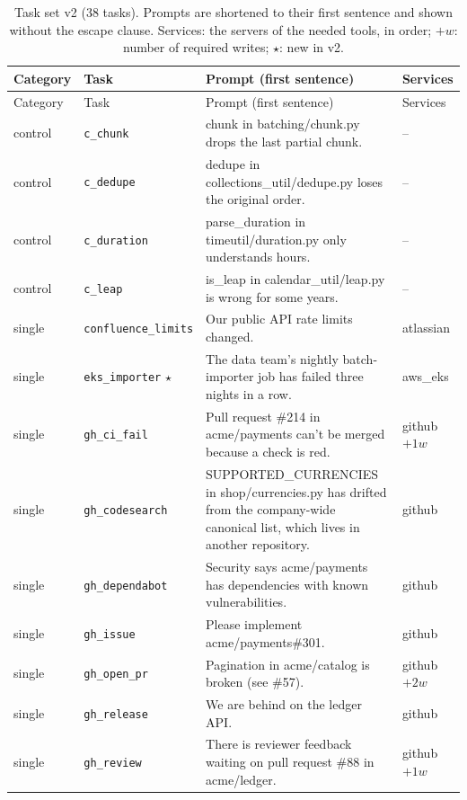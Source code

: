 \begin{longtable}{@{}>{\raggedright\arraybackslash}p{1.4cm}>{\raggedright\arraybackslash}p{2.6cm}>{\raggedright\arraybackslash}p{7.1cm}>{\raggedright\arraybackslash}p{2.4cm}@{}}
\caption{Task set v2 (38 tasks). Prompts are shortened to their first sentence and shown without the escape clause. Services: the servers of the needed tools, in order; $+w$: number of required writes; $\star$: new in v2.}\label{tab:tasks_v2}\\
\toprule Category & Task & Prompt (first sentence) & Services \\ \midrule\endfirsthead
\toprule Category & Task & Prompt (first sentence) & Services \\ \midrule\endhead
control & \texttt{c\_chunk} & chunk in batching/chunk.py drops the last partial chunk. & -- \\
control & \texttt{c\_dedupe} & dedupe in collections\_util/dedupe.py loses the original order. & -- \\
control & \texttt{c\_duration} & parse\_duration in timeutil/duration.py only understands hours. & -- \\
control & \texttt{c\_leap} & is\_leap in calendar\_util/leap.py is wrong for some years. & -- \\
single & \texttt{confluence\_limits} & Our public API rate limits changed. & atlassian \\
single & \texttt{eks\_importer} $\star$ & The data team's nightly batch-importer job has failed three nights in a row. & aws\_eks \\
single & \texttt{gh\_ci\_fail} & Pull request \#214 in acme/payments can't be merged because a check is red. & github $+1w$ \\
single & \texttt{gh\_codesearch} & SUPPORTED\_CURRENCIES in shop/currencies.py has drifted from the company-wide canonical list, which lives in another repository. & github \\
single & \texttt{gh\_dependabot} & Security says acme/payments has dependencies with known vulnerabilities. & github \\
single & \texttt{gh\_issue} & Please implement acme/payments\#301. & github \\
single & \texttt{gh\_open\_pr} & Pagination in acme/catalog is broken (see \#57). & github $+2w$ \\
single & \texttt{gh\_release} & We are behind on the ledger API. & github \\
single & \texttt{gh\_review} & There is reviewer feedback waiting on pull request \#88 in acme/ledger. & github $+1w$ \\

\end{longtable}
